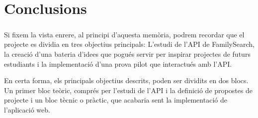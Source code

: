 \chapter{Conclusions}

    \paragraph{}
    Si fixem la vista enrere, al principi d'aquesta memòria, podrem recordar que el projecte es dividia en tres objectius principals: L'estudi de l'API de FamilySearch, la creació d'una bateria d'idees que pogués servir per inspirar projectes de futurs estudiants i la implementació d'una prova pilot que interactués amb l'API.

    En certa forma, els principals objectius descrits, poden ser dividits en dos blocs. Un primer bloc teòric, comprés per l’estudi de l’API i la definició de propostes de projecte i un bloc tècnic o pràctic, que acabaria sent la implementació de l’aplicació web.

    
    
    

